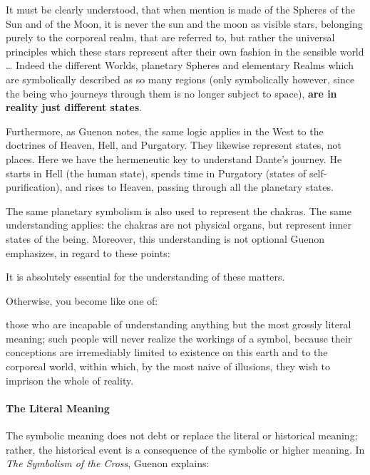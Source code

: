 \begin{quotex}
It must be clearly understood, that when mention is made of the Spheres of the Sun and of the Moon, it is never the sun and the moon as visible stars, belonging purely to the corporeal realm, that are referred to, but rather the universal principles which these stars represent after their own fashion in the sensible world … Indeed the different Worlds, planetary Spheres and elementary Realms which are symbolically described as so many regions (only symbolically however, since the being who journeys through them is no longer subject to space), \textbf{are in reality just different states}.

\end{quotex}
Furthermore, as Guenon notes, the same logic applies in the West to the doctrines of Heaven, Hell, and Purgatory. They likewise represent states, not places. Here we have the hermeneutic key to understand Dante's journey. He starts in Hell (the human state), spends time in Purgatory (states of self-purification), and rises to Heaven, passing through all the planetary states.

The same planetary symbolism is also used to represent the chakras. The same understanding applies: the chakras are not physical organs, but represent inner states of the being. Moreover, this understanding is not optional Guenon emphasizes, in regard to these points:

\begin{quotex}
It is absolutely essential for the understanding of these matters.

\end{quotex}
Otherwise, you become like one of:

\begin{quotex}
those who are incapable of understanding anything but the most grossly literal meaning; such people will never realize the workings of a symbol, because their conceptions are irremediably limited to existence on this earth and to the corporeal world, within which, by the most naive of illusions, they wish to imprison the whole of reality.

\end{quotex}
\paragraph{The Literal Meaning}
The symbolic meaning does not debt or replace the literal or historical meaning; rather, the historical event is a consequence of the symbolic or higher meaning. In \emph{The Symbolism of the Cross}, Guenon explains:

